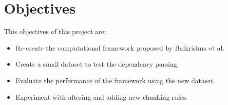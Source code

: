 \chapter{Objectives}
This objectives of this project are:
\begin{itemize}
    \item Re-create the computational framework proposed by Balkrishna et al\cite{balCompGrammar}.
    \item Create a small dataset to test the dependency parsing.
    \item Evaluate the performance of the framework using the new dataset.
    \item Experiment with altering and adding new chunking rules.
\end{itemize}

